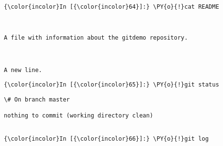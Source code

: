     \begin{Verbatim}[commandchars=\\\{\}]
{\color{incolor}In [{\color{incolor}64}]:} \PY{o}{!}cat README
\end{Verbatim}

    \begin{Verbatim}[commandchars=\\\{\}]


A file with information about the gitdemo repository.



A new line.
    \end{Verbatim}

    \begin{Verbatim}[commandchars=\\\{\}]
{\color{incolor}In [{\color{incolor}65}]:} \PY{o}{!}git status
\end{Verbatim}

    \begin{Verbatim}[commandchars=\\\{\}]
\# On branch master

nothing to commit (working directory clean)


    \end{Verbatim}







    \begin{Verbatim}[commandchars=\\\{\}]
{\color{incolor}In [{\color{incolor}66}]:} \PY{o}{!}git log
\end{Verbatim}

